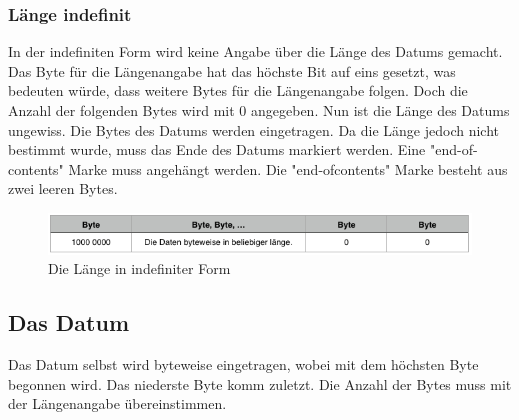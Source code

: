 \documentclass[11pt,a4paper]{article}
\begin{document}
\subsubsection{Länge indefinit}
In der indefiniten Form wird keine Angabe über die Länge des Datums gemacht. Das Byte für die Längenangabe hat das höchste Bit auf eins gesetzt, was bedeuten würde, dass weitere Bytes für die Längenangabe folgen. Doch die Anzahl der folgenden Bytes wird mit 0 angegeben. Nun ist die Länge des Datums ungewiss. Die Bytes des Datums werden eingetragen. Da die Länge jedoch nicht bestimmt wurde, muss das Ende des Datums markiert werden. Eine "end-of-contents" Marke muss angehängt werden. Die "end-ofcontents" Marke besteht aus zwei leeren Bytes.
\\
\begin{figure}[h]
	\centering
	\includegraphics[scale=.75]{Bilder/laengeIndefinit}
	\caption{Die Länge in indefiniter Form}
\end{figure}

\subsection{Das Datum}
Das Datum selbst wird byteweise eingetragen, wobei mit dem höchsten Byte begonnen wird. Das niederste Byte komm zuletzt. Die Anzahl der Bytes muss mit der Längenangabe übereinstimmen.
\\

\end{document}
